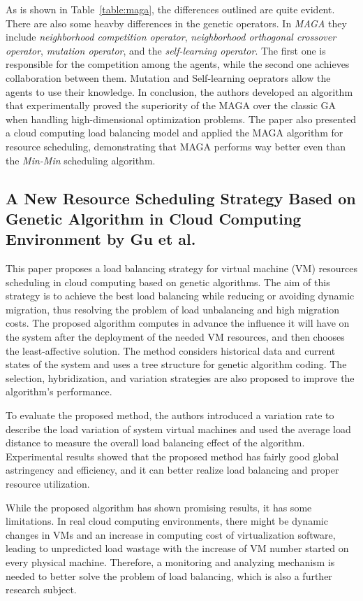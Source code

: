 As is shown in Table~\ref{table:maga}, the differences outlined are quite evident.
There are also some heavby differences in the genetic operators.
In \textit{MAGA} they include \textit{neighborhood competition operator}, \textit{neighborhood orthogonal crossover operator}, 
\textit{mutation operator}, and the \textit{self-learning operator}.
The first one is responsible for the competition among the agents, while the second one achieves collaboration between them. 
Mutation and Self-learning oeprators allow the agents to use their knowledge.
In conclusion, the authors developed an algorithm that experimentally proved the superiority of the MAGA over the classic GA when handling high-dimensional optimization problems.
The paper also presented a cloud computing load balancing model and applied the MAGA algorithm for resource scheduling, demonstrating that MAGA performs way better even than
the \textit{Min-Min} scheduling algorithm.~\cite{zhu2011genetic}

\subsection{A New Resource Scheduling Strategy Based on Genetic Algorithm in Cloud Computing Environment by Gu et al.}
This paper proposes a load balancing strategy for virtual machine (VM) resources scheduling in cloud computing based on genetic algorithms. 
The aim of this strategy is to achieve the best load balancing while reducing or avoiding dynamic migration, 
thus resolving the problem of load unbalancing and high migration costs. 
The proposed algorithm computes in advance the influence it will have on the system after the deployment of the needed VM resources, 
and then chooses the least-affective solution. 
The method considers historical data and current states of the system and uses a tree structure for genetic algorithm coding. 
The selection, hybridization, and variation strategies are also proposed to improve the algorithm's performance.

To evaluate the proposed method, the authors introduced a variation rate to describe the load variation of system virtual machines and used the average load distance 
to measure the overall load balancing effect of the algorithm. Experimental results showed that the proposed method has fairly good global astringency and efficiency, 
and it can better realize load balancing and proper resource utilization.

While the proposed algorithm has shown promising results, it has some limitations. 
In real cloud computing environments, there might be dynamic changes in VMs and an increase in computing cost of virtualization software, 
leading to unpredicted load wastage with the increase of VM number started on every physical machine. 
Therefore, a monitoring and analyzing mechanism is needed to better solve the problem of load balancing, which is also a further research subject.~\cite{gu2012new}

